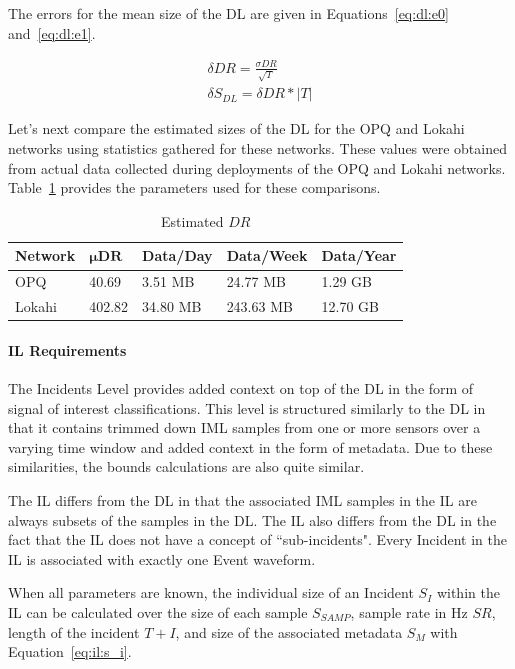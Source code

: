 The errors for the mean size of the DL are given in Equations~\ref{eq:dl:e0} and~\ref{eq:dl:e1}.

\begin{align}
	\delta DR = \frac{\sigma DR}{\sqrt{T}} \label{eq:dl:e0} \\
	\delta S_{DL} = \delta {DR} * |T| \label{eq:dl:e1}
\end{align}

Let's next compare the estimated sizes of the DL for the OPQ and Lokahi networks using statistics gathered for these networks. These values were obtained from actual data collected during deployments of the OPQ and Lokahi networks. Table~\ref{table:estimated_mu_dr} provides the parameters used for these comparisons.

\begin{table}[H]
	\centering
	\caption{Estimated $DR$}
	\begin{tabularx}{\textwidth}{lllll}
		\toprule
		\textbf{Network} & $\bm{\mu DR}$ & \textbf{Data/Day} & \textbf{Data/Week} & \textbf{Data/Year} \\
		\midrule
		OPQ & 40.69 & 3.51 MB & 24.77 MB & 1.29 GB \\
		Lokahi & 402.82 & 34.80 MB & 243.63 MB & 12.70 GB \\
		\bottomrule
	\end{tabularx}
	\label{table:estimated_mu_dr}
\end{table}

\paragraph{IL Requirements}
The Incidents Level provides added context on top of the DL in the form of signal of interest classifications. This level is structured similarly to the DL in that it contains trimmed down IML samples from one or more sensors over a varying time window and added context in the form of metadata. Due to these similarities, the bounds calculations are also quite similar.

The IL differs from the DL in that the associated IML samples in the IL are always subsets of the samples in the DL\@. The IL also differs from the DL in the fact that the IL does not have a concept of ``sub-incidents". Every Incident in the IL is associated with exactly one Event waveform.

When all parameters are known, the individual size of an Incident $S_{I}$ within the IL can be calculated over the size of each sample $S_{SAMP}$, sample rate in Hz $SR$, length of the incident $T+{I}$, and size of the associated metadata $S_{M}$ with Equation~\ref{eq:il:s_i}.

